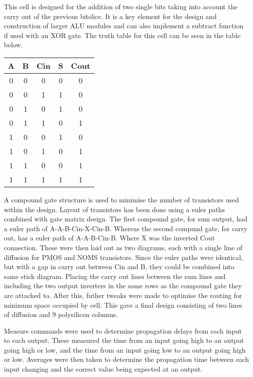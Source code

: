
This cell is designed for the addition of two single bits taking into account the carry out of the previous bitslice.
It is a key element for the design and construction of larger ALU modules and can also implement a subtract function if used with an XOR gate.
The truth table for this cell can be seen in the table below.

\begin{tabular}{| c | c | c || c | c |}
\hline
A & B & Cin & S & Cout \\ \hline
0 & 0 & 0   & 0 & 0    \\
0 & 0 & 1   & 1 & 0    \\
0 & 1 & 0   & 1 & 0    \\
0 & 1 & 1   & 0 & 1    \\
1 & 0 & 0   & 1 & 0    \\
1 & 0 & 1   & 0 & 1    \\
1 & 1 & 0   & 0 & 1    \\
1 & 1 & 1   & 1 & 1    \\ \hline
\end{tabular}

A compound gate structure is used to minimise the number of transistors used within the design. 
Layout of transistors has been done using a euler paths combined with gate matrix design.
The first compound gate, for sum output, had a euler path of A-A-B-Cin-X-Cin-B. Whereas the second compund gate, for carry out, has a euler path of A-A-B-Cin-B. Where X was the inverted Cout connection.
These were then laid out as two diagrams, each with a single line of diffusion for PMOS and NOMS transistors.
Since the euler paths were identical, but with a gap in carry out between Cin and B, they could be combined into same stick diagram. Placing the carry out lines between the sum lines and including the two output inverters in the same rows as the compound gate they are attached to.
After this, futher tweaks were made to optimise the routing for minimum space occupied by cell. 
This gave a final design consisting of two lines of diffusion and 9 polysilicon columns. 


Measure commands were used to determine propagation delays from each input to each output. These measured the time from an input going high to an output going high or low, and the time from an input going low to an output going high or low. 
Averages were then taken to determine the propagation time between each input changing and the correct value being expected at an output. 